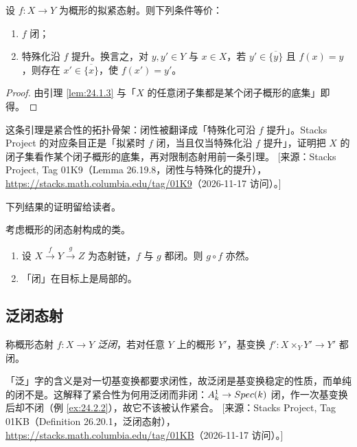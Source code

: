 \begin{corollary}\label{cor:24.1.4}
设 $f\colon X \to Y$ 为概形的拟紧态射。则下列条件等价：
\begin{enumerate}[label=(\roman*),leftmargin=2em,itemsep=0.25ex]
  \item $f$ 闭；
  \item 特殊化沿 $f$ 提升。换言之，对 $y, y' \in Y$ 与 $x \in X$，若 $y' \in \overline{\{y\}}$ 且 $f(x) = y$，则存在 $x' \in \overline{\{x\}}$，使 $f(x') = y'$。
\end{enumerate}
\end{corollary}

\begin{proof}
由引理 \ref{lem:24.1.3} 与「$X$ 的任意闭子集都是某个闭子概形的底集」即得。
\end{proof}

\begin{yizhu}
这条引理是紧合性的拓扑骨架：闭性被翻译成「特殊化可沿 $f$ 提升」。Stacks Project 的对应条目正是「拟紧时 $f$ 闭，当且仅当特殊化沿 $f$ 提升」，证明把 $X$ 的闭子集看作某个闭子概形的底集，再对限制态射用前一条引理。
[来源：Stacks Project, Tag 01K9（Lemma 26.19.8，闭性与特殊化的提升），\url{https://stacks.math.columbia.edu/tag/01K9}（2026-11-17 访问）。]
\end{yizhu}

下列结果的证明留给读者。

\begin{lemma}\label{lem:24.1.5}
考虑概形的闭态射构成的类。
\begin{enumerate}[label=(\roman*),leftmargin=2em,itemsep=0.25ex]
  \item 设 $X \xrightarrow{f} Y \xrightarrow{g} Z$ 为态射链，$f$ 与 $g$ 都闭。则 $g \circ f$ 亦然。
  \item 「闭」在目标上是局部的。
\end{enumerate}
\end{lemma}

\subsection{泛闭态射}\label{sec:24.2}

\begin{definition}\label{def:24.2.1}
称概形态射 $f\colon X \to Y$ \emph{泛闭}，若对任意 $Y$ 上的概形 $Y'$，基变换 $f'\colon X \times_Y Y' \to Y'$ 都闭。
\end{definition}

\begin{yizhu}
「泛」字的含义是对一切基变换都要求闭性，故泛闭是基变换稳定的性质，而单纯的闭不是。这解释了紧合性为何用泛闭而非闭：$A^1_k \to Spec(k)$ 闭，作一次基变换后却不闭（例 \ref{ex:24.2.2}），故它不该被认作紧合。
[来源：Stacks Project, Tag 01KB（Definition 26.20.1，泛闭态射），\url{https://stacks.math.columbia.edu/tag/01KB}（2026-11-17 访问）。]
\end{yizhu}

